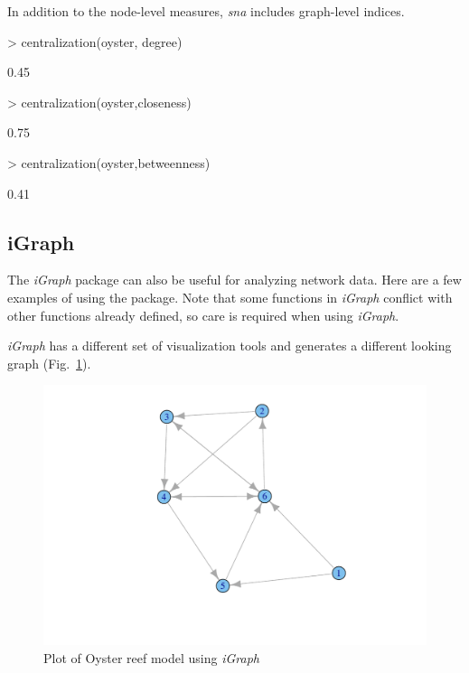 \documentclass[article]{jss}
\begin{document}
In addition to the node-level measures, \textit{sna} includes graph-level
indices.

\begin{Schunk}
\begin{Sinput}
> centralization(oyster, degree)
\end{Sinput}
\begin{Soutput}
[1] 0.45
\end{Soutput}
\begin{Sinput}
> centralization(oyster,closeness)
\end{Sinput}
\begin{Soutput}
[1] 0.75
\end{Soutput}
\begin{Sinput}
> centralization(oyster,betweenness)
\end{Sinput}
\begin{Soutput}
[1] 0.41
\end{Soutput}
\end{Schunk}

\subsection{iGraph}
The \textit{iGraph} package can also be useful for analyzing network
data.  Here are a few examples of using the package.  Note that some
functions in \textit{iGraph} conflict with other functions already defined, so
care is required when using \textit{iGraph}.

\begin{Schunk}
\end{Schunk}

\textit{iGraph} has a different set of visualization tools and
generates a different looking graph (Fig.~\ref{fig:igraph}).

\begin{figure}
\center
\includegraphics{enaR-vignette-053}
\caption{Plot of Oyster reef model using \textit{iGraph}}\label{fig:igraph}
\end{figure}
\end{document}
